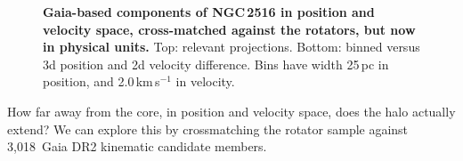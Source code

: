 \documentclass[12pt,twocolumn,tighten]{aastex63}
\newcommand{\nkinematic}{3{,}018\ } %
\begin{document}
\begin{figure}[t]
	\begin{center}
		\leavevmode
	
	\end{center}
	\vspace{-0.7cm}
	\caption{ {\bf Gaia-based components of NGC\,2516 in position and
    velocity space, cross-matched against the rotators, but now in
    physical units.}
    Top: relevant projections. Bottom: binned versus 3d position and
    2d velocity difference.
    Bins have width 25\,pc in position, and 2.0\,km\,s$^{-1}$ in
    velocity.
		\label{fig:physical_x_rotn}
	}
\end{figure}

How far away from the core, in position and velocity space, does the
halo actually extend?  We can explore this by crossmatching the
rotator sample against \nkinematic Gaia DR2 kinematic candidate
members.  
\end{document}
